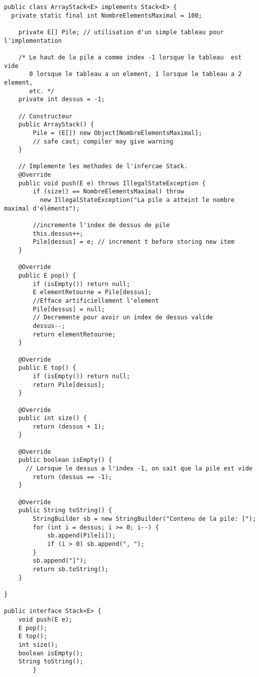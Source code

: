 \documentclass[10pt]{report}
\begin{document}
    \begin{lstlisting}[style=JavaDraculaWhite]
public class ArrayStack<E> implements Stack<E> {
  private static final int NombreElementsMaximal = 100;

    private E[] Pile; // utilisation d'un simple tableau pour l'implementation
    
    /* Le haut de la pile a comme index -1 lorsque le tableau  est vide 
       0 lorsque le tableau a un element, 1 lorsque le tableau a 2 element, 
       etc. */
    private int dessus = -1; 

    // Constructeur
    public ArrayStack() {
        Pile = (E[]) new Object[NombreElementsMaximal]; 
        // safe cast; compiler may give warning
    }

    // Implemente les methodes de l'infercae Stack.
    @Override
    public void push(E e) throws IllegalStateException {
        if (size() == NombreElementsMaximal) throw 
          new IllegalStateException("La pile a atteint le nombre maximal d'éléments");

        //incremente l'index de dessus de pile
        this.dessus++; 
        Pile[dessus] = e; // increment t before storing new item
    }

    @Override
    public E pop() {
        if (isEmpty()) return null;
        E elementRetourne = Pile[dessus];
        //Efface artificiellement l'element
        Pile[dessus] = null;
        // Decremente pour avoir un index de dessus valide
        dessus--;
        return elementRetourne;
    }

    @Override
    public E top() {
        if (isEmpty()) return null;
        return Pile[dessus];
    }

    @Override
    public int size() {
        return (dessus + 1);
    }

    @Override
    public boolean isEmpty() {
      // Lorsque le dessus a l'index -1, on sait que la pile est vide
        return (dessus == -1);
    }

    @Override
    public String toString() {
        StringBuilder sb = new StringBuilder("Contenu de la pile: [");
        for (int i = dessus; i >= 0; i--) {
            sb.append(Pile[i]);
            if (i > 0) sb.append(", ");
        }
        sb.append("]");
        return sb.toString();
    }
  
} 

public interface Stack<E> {
    void push(E e);
    E pop();
    E top();
    int size();
    boolean isEmpty();
    String toString();
        }
    \end{lstlisting}
\end{document}
